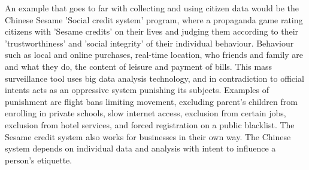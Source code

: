 An example that goes to far with collecting and using citizen data would be the Chinese Sesame 'Social credit system' program\cite{meissner2017china}\cite{china_botsman}\cite{china_wiki}, where a propaganda game rating citizens with 'Sesame credits' on their lives and judging them according to their 'trustworthiness' and 'social integrity' of their individual behaviour. Behaviour such as local and online purchases, real-time location, who friends and family are and what they do, the content of leisure and payment of bills. This mass surveillance tool uses big data analysis technology, and in contradiction to official intents acts as an oppressive system punishing its subjects. Examples of punishment are flight bans limiting movement, excluding parent's children from enrolling in private schools, slow internet access, exclusion from certain jobs, exclusion from hotel services, and forced registration on a public blacklist. The Sesame credit system also works for businesses in their own way. The Chinese system depends on individual data and analysis with intent to influence a person's etiquette.






